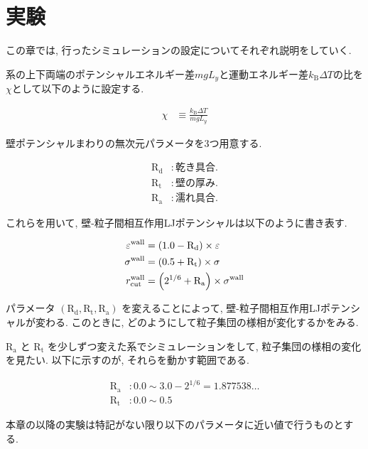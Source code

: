 \section{実験}\label{sec:simulation}

この章では, 行ったシミュレーションの設定についてそれぞれ説明をしていく.

系の上下両端のポテンシャルエネルギー差$mgL_y$と運動エネルギー差$k_{\text{B}}\Delta T$の比を$\chi$として以下のように設定する.

\begin{align}
  \chi &\equiv \frac{k_{\text{B}}\Delta T}{mgL_{y}}
\end{align}

壁ポテンシャルまわりの無次元パラメータを3つ用意する.

\begin{align}
  \text{R}_\text{d} &: 乾き具合. \\
  \text{R}_\text{t} &: 壁の厚み. \\
  \text{R}_\text{a} &: 濡れ具合.
\end{align}

これらを用いて, 壁-粒子間相互作用LJポテンシャルは以下のように書き表す.

\begin{align}
  \varepsilon^{\text{wall}} &= \qty(1.0 - \text{R}_\text{d}) \times \varepsilon \\
  \sigma^{\text{wall}} &= \qty(0.5 + \text{R}_\text{t}) \times \sigma \\
  r^{\text{wall}}_{\text{cut}} &= \qty(2^{1/6} + \text{R}_\text{a}) \times \sigma^{\text{wall}}
\end{align}

パラメータ $(\text{R}_\text{d}, \text{R}_\text{t}, \text{R}_\text{a})$ を変えることによって, 壁-粒子間相互作用LJポテンシャルが変わる. このときに, どのようにして粒子集団の様相が変化するかをみる.

$\text{R}_\text{a}$ と $\text{R}_\text{t}$ を少しずつ変えた系でシミュレーションをして, 粒子集団の様相の変化を見たい. 以下に示すのが, それらを動かす範囲である.

\begin{align}
  \text{R}_\text{a} &\colon 0.0 \sim 3.0 - 2^{1/6} = 1.877538\dots \\
  \text{R}_\text{t} &\colon 0.0 \sim 0.5
\end{align}



本章の以降の実験は特記がない限り以下のパラメータに近い値で行うものとする. 

